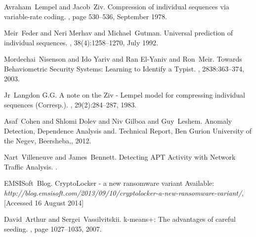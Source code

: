 \documentclass[13pt,journal,compsoc,onecolumn]{IEEEtran}
\begin{document}
%
%
%
\begin{thebibliography}{10}

Avraham~Lempel and Jacob~Ziv.
\newblock Compression of individual sequences via variable-rate coding.
, page 530–536, September 1978.

Meir~Feder and Neri Merhav and Michael~Gutman.
\newblock Universal prediction of individual sequences.
, 38(4):1258–1270, July 1992.

Mordechai~Nisenson and Ido Yariv and Ran El-Yaniv and Ron~Meir.
\newblock Towards Behaviometric Security Systems: Learning to Identify a Typist.
, 2838:363–374, 2003.

Jr~Langdon G.G.
\newblock A note on the Ziv - Lempel model for compressing individual sequences (Corresp.).
, 29(2):284–287, 1983.

Asaf~Cohen and Shlomi Dolev and Niv Gilboa and Guy~Leshem.
\newblock Anomaly Detection, Dependence Analysis and.
\newblock Technical Report, Ben Gurion University of the Negev, Beersheba,, 2012.

Nart~Villeneuve and James~Bennett.
\newblock Detecting APT Activity with Network Traffic Analysis.
.

EMSISoft~Blog.
\newblock CryptoLocker - a new ransomware variant
\newblock Available: {\em http://blog.emsisoft.com/2013/09/10/cryptolocker-a-new-ransomware-variant/}, [Accessed 16 August 2014]

David~Arthur and Sergei~Vassilvitskii.
\newblock k-means+: The advantages of careful seeding.
, page 1027–1035, 2007.


\end{thebibliography}
\end{document}
